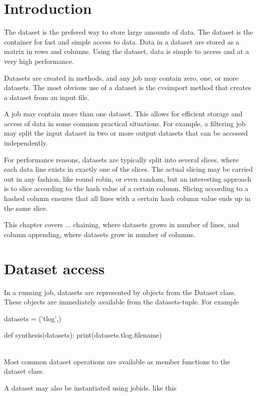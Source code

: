 \section{Introduction}

The dataset is the prefered way to store large amounts of data.  The
dataset is the container for fast and simple access to data.  Data in
a dataset are stored as a matrix in rows and columns.  Using the
dataset, data is simple to access and at a very high performance.

Datasets are created in methods, and any job may contain zero, one, or
more datasets.  The most obvious use of a dataset is the cvsimport
method that creates a dataset from an input file.

A job may contain more than one dataset.  This allows for efficient
storage and access of data in some common practical situations.  For
example, a filtering job may split the input dataset in two or more
output datasets that can be accessed independently.

For performance reasons, datasets are typically split into several
slices, where each data line exists in exactly one of the slices.  The
actual slicing may be carried out in any fashion, like round robin, or
even random, but an interesting approach is to slice according to the
hash value of a certain column.  Slicing according to a hashed column
ensures that all lines with a certain hash column value ends up in the
same slice.

This chapter covers ...
chaining, where datasets grows in number of lines, and column
appending, where datasets grow in number of columns.



\newpage
\section{Dataset access}

In a running job, datasets are represented by objects from the Dataset
class.  These objects are immediately available from the
datasets-tuple.  For example

\begin{python}
datasets = ('tlog',)

def synthesis(datasets):
  print(datasets.tlog.filename)
\end{python}
\\
Most common dataset operations are available as member functions
to the dataset class.

A dataset may also be instantiated using jobids. like this

